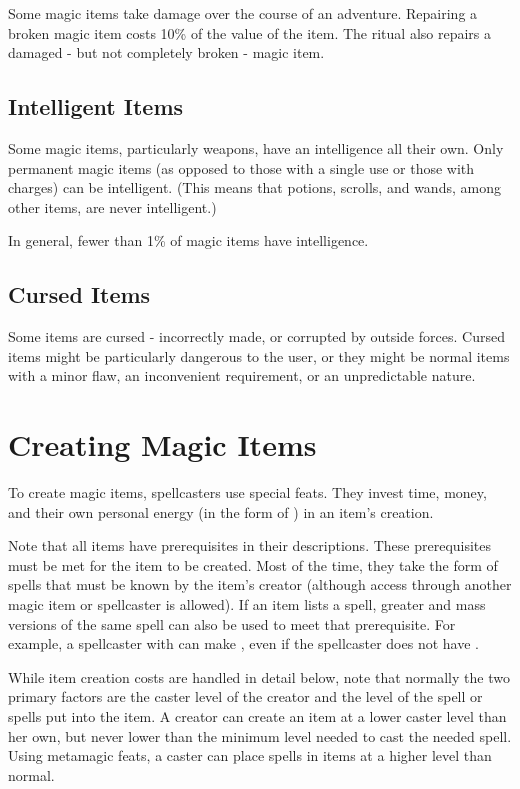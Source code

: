 Some magic items take damage over the course of an adventure. Repairing a broken magic item costs 10\% of the value of the item. The  ritual also repairs a damaged - but not completely broken - magic item.

\subsection{Intelligent Items}

Some magic items, particularly weapons, have an intelligence all their own. Only permanent magic items (as opposed to those with a single use or those with charges) can be intelligent. (This means that potions, scrolls, and wands, among other items, are never intelligent.)

In general, fewer than 1\% of magic items have intelligence.

\subsection{Cursed Items}

Some items are cursed - incorrectly made, or corrupted by outside forces. Cursed items might be particularly dangerous to the user, or they might be normal items with a minor flaw, an inconvenient requirement, or an unpredictable nature.

\section{Creating Magic Items}

To create magic items, spellcasters use special feats. They invest time, money, and their own personal energy (in the form of ) in an item's creation.

Note that all items have prerequisites in their descriptions. These prerequisites must be met for the item to be created. Most of the time, they take the form of spells that must be known by the item's creator (although access through another magic item or spellcaster is allowed). If an item lists a spell, greater and mass versions of the same spell can also be used to meet that prerequisite. For example, a spellcaster with  can make , even if the spellcaster does not have .

While item creation costs are handled in detail below, note that normally the two primary factors are the caster level of the creator and the level of the spell or spells put into the item. A creator can create an item at a lower caster level than her own, but never lower than the minimum level needed to cast the needed spell. Using metamagic feats, a caster can place spells in items at a higher level than normal.

